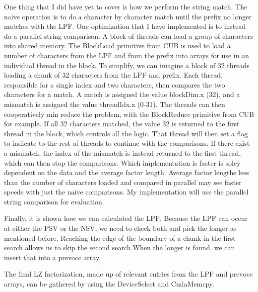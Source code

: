 One thing that I did have yet to cover is how we perform the string match.
The naive operation is to do a character by character match until the prefix no longer matches with the LPF.
One optimization that I have implemented is to instead do a parallel string comparison.
A block of threads can load a group of characters into shared memory.
The BlockLoad primitive from CUB is used to load a number of characters from the LPF and from the prefix into arrays for use in an individual thread in the block.
To simplify, we can imagine a block of 32 threads loading a chunk of 32 characters from the LPF and prefix.
Each thread, responsible for a single index and two characters, then compares the two characters for a match.
A match is assigned the value blockDim.x (32), and a mismatch is assigned the value threadIdx.x (0-31).
The threads can then cooperatively min reduce the problem, with the BlockReduce primitive from CUB for example.
If all 32 characters matched, the value 32 is returned to the first thread in the block, which controls all the logic.
That thread will then set a flag to indicate to the rest of threads to continue with the comparisons.
If there exist a mismatch, the index of the mismatch is instead returned to the first thread, which can then stop the comparisons.
Which implementation is faster is soley dependent on the data and the average factor length.
Average factor lengths less than the number of characters loaded and compared in parallel may see faster speeds with just the naive comparisons.
My implementation will use the parallel string comparison for evaluation.

Finally, it is shown how we can calculated the LPF. 
Because the LPF can occur at either the PSV or the NSV, we need to check both and pick the longer as mentioned before. 
Reaching the edge of the boundary of a chunk in the first search allows us to skip the second search.When the longer is found, we can insert that into a prevocc array. 

The final LZ factorization, made up of relevant entries from the LPF and prevocc arrays, can be gathered by using the DeviceSelect and CudaMemcpy.

